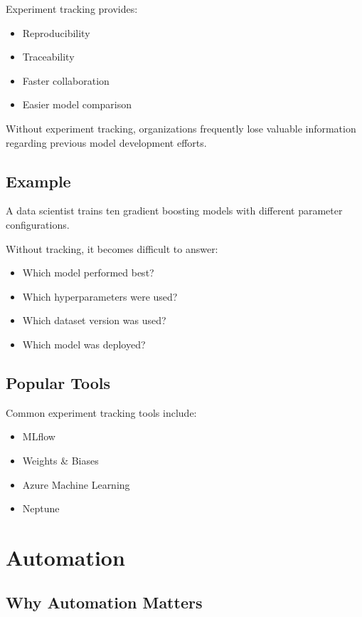 Experiment tracking provides:

\begin{itemize}
    \item Reproducibility
    \item Traceability
    \item Faster collaboration
    \item Easier model comparison
\end{itemize}

Without experiment tracking, organizations frequently lose valuable information regarding previous model development efforts.

\subsection{Example}

A data scientist trains ten gradient boosting models with different parameter configurations.

Without tracking, it becomes difficult to answer:

\begin{itemize}
    \item Which model performed best?
    \item Which hyperparameters were used?
    \item Which dataset version was used?
    \item Which model was deployed?
\end{itemize}

\subsection{Popular Tools}

Common experiment tracking tools include:

\begin{itemize}
    \item MLflow
    \item Weights \& Biases
    \item Azure Machine Learning
    \item Neptune
\end{itemize}

\section{Automation}

\subsection{Why Automation Matters}

